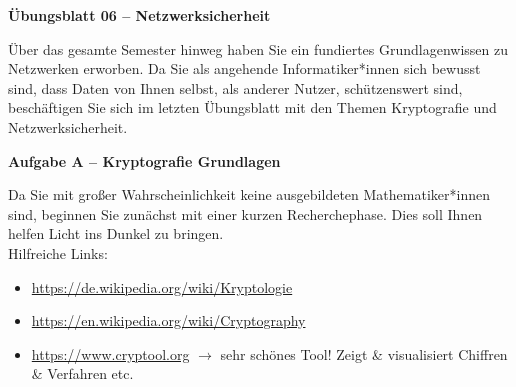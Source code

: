 \documentclass[paper=a4,fontsize=11pt]{scrartcl}%
\begin{document}
\begin{center}
\Large{\textbf{Übungsblatt 06 -- Netzwerksicherheit}}
\end{center}
Über das gesamte Semester hinweg haben Sie ein fundiertes Grundlagenwissen zu Netzwerken erworben. Da Sie als angehende Informatiker*innen sich bewusst sind, dass Daten von Ihnen selbst, als anderer Nutzer, schützenswert sind, beschäftigen Sie sich im letzten Übungsblatt mit den Themen Kryptografie und Netzwerksicherheit.

\begin{center}\Large{\textbf{Aufgabe A -- Kryptografie Grundlagen}}\end{center}\vskip0.25in
Da Sie mit großer Wahrscheinlichkeit keine ausgebildeten Mathematiker*innen sind, beginnen Sie zunächst mit einer kurzen Recherchephase. Dies soll Ihnen helfen Licht ins Dunkel zu bringen.\\
Hilfreiche Links:
\begin{itemize}
	\item \url{https://de.wikipedia.org/wiki/Kryptologie}
	\item \url{https://en.wikipedia.org/wiki/Cryptography}
	\item \url{https://www.cryptool.org} $\rightarrow$ sehr schönes Tool! Zeigt \& visualisiert Chiffren \& Verfahren etc.
\end{itemize}
\end{document}
